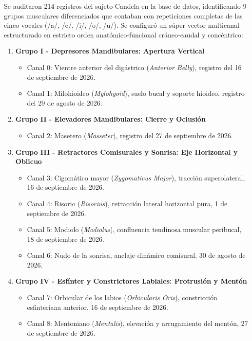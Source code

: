 \documentclass[11pt,a4paper,openany]{book}
\theoremstyle{definition}
\begin{document}
Se auditaron 214 registros del sujeto Candela en la base de datos, identificando 9 grupos musculares diferenciados que contaban con repeticiones completas de las cinco vocales (/a/, /e/, /i/, /o/, /u/). Se configuró un súper-vector multicanal estructurado en estricto orden anatómico-funcional cráneo-caudal y concéntrico:
\begin{enumerate}
    \item \textbf{Grupo I - Depresores Mandibulares: Apertura Vertical}
    \begin{itemize}
        \item Canal 0: Vientre anterior del digástrico (\textit{Anterior Belly}), registro del 16 de septiembre de 2026.
        \item Canal 1: Milohioideo (\textit{Mylohyoid}), suelo bucal y soporte hioideo, registro del 29 de agosto de 2026.
    \end{itemize}
    \item \textbf{Grupo II - Elevadores Mandibulares: Cierre y Oclusión}
    \begin{itemize}
        \item Canal 2: Masetero (\textit{Masseter}), registro del 27 de septiembre de 2026.
    \end{itemize}
    \item \textbf{Grupo III - Retractores Comisurales y Sonrisa: Eje Horizontal y Oblicuo}
    \begin{itemize}
        \item Canal 3: Cigomático mayor (\textit{Zygomaticus Major}), tracción superolateral, 16 de septiembre de 2026.
        \item Canal 4: Risorio (\textit{Risorius}), retracción lateral horizontal pura, 1 de septiembre de 2026.
        \item Canal 5: Modiolo (\textit{Modiolus}), confluencia tendinosa muscular peribucal, 18 de septiembre de 2026.
        \item Canal 6: Nudo de la sonrisa, anclaje dinámico comisural, 30 de agosto de 2026.
    \end{itemize}
    \item \textbf{Grupo IV - Esfínter y Constrictores Labiales: Protrusión y Mentón}
    \begin{itemize}
        \item Canal 7: Orbicular de los labios (\textit{Orbicularis Oris}), constricción esfinteriana anterior, 16 de septiembre de 2026.
        \item Canal 8: Mentoniano (\textit{Mentalis}), elevación y arrugamiento del mentón, 27 de septiembre de 2026.
    \end{itemize}
\end{enumerate}
\end{document}
